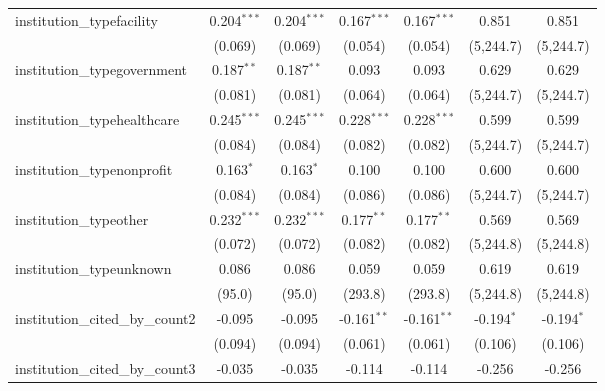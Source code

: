 \begin{tabular}{lcccccc}
   institution\_typefacility             & 0.204$^{***}$ & 0.204$^{***}$ & 0.167$^{***}$ & 0.167$^{***}$ & 0.851         & 0.851\\   
                                         & (0.069)       & (0.069)       & (0.054)       & (0.054)       & (5,244.7)     & (5,244.7)\\   
   institution\_typegovernment           & 0.187$^{**}$  & 0.187$^{**}$  & 0.093         & 0.093         & 0.629         & 0.629\\   
                                         & (0.081)       & (0.081)       & (0.064)       & (0.064)       & (5,244.7)     & (5,244.7)\\   
   institution\_typehealthcare           & 0.245$^{***}$ & 0.245$^{***}$ & 0.228$^{***}$ & 0.228$^{***}$ & 0.599         & 0.599\\   
                                         & (0.084)       & (0.084)       & (0.082)       & (0.082)       & (5,244.7)     & (5,244.7)\\   
   institution\_typenonprofit            & 0.163$^{*}$   & 0.163$^{*}$   & 0.100         & 0.100         & 0.600         & 0.600\\   
                                         & (0.084)       & (0.084)       & (0.086)       & (0.086)       & (5,244.7)     & (5,244.7)\\   
   institution\_typeother                & 0.232$^{***}$ & 0.232$^{***}$ & 0.177$^{**}$  & 0.177$^{**}$  & 0.569         & 0.569\\   
                                         & (0.072)       & (0.072)       & (0.082)       & (0.082)       & (5,244.8)     & (5,244.8)\\   
   institution\_typeunknown              & 0.086         & 0.086         & 0.059         & 0.059         & 0.619         & 0.619\\   
                                         & (95.0)        & (95.0)        & (293.8)       & (293.8)       & (5,244.8)     & (5,244.8)\\   
   institution\_cited\_by\_count2        & -0.095        & -0.095        & -0.161$^{**}$ & -0.161$^{**}$ & -0.194$^{*}$  & -0.194$^{*}$\\   
                                         & (0.094)       & (0.094)       & (0.061)       & (0.061)       & (0.106)       & (0.106)\\   
   institution\_cited\_by\_count3        & -0.035        & -0.035        & -0.114        & -0.114        & -0.256        & -0.256\\   

\end{tabular}
